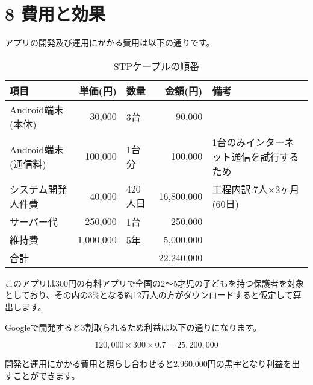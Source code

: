 \documentclass[a4j,titlepage]{jarticle}
\begin{document}
\section{8 費用と効果}
アプリの開発及び運用にかかる費用は以下の通りです。
　\begin{table}[htp]
\begin{center}
  \caption{STPケーブルの順番}
  \begin{tabular}{|l|r|l|r|l|}\hline
    項目& 単価(円) & 数量 & 金額(円) & 備考  \\ \hline 
    Android端末(本体)& 30,000 & 3台 & 90,000 & 　 \\ \hline
    Android端末(通信料)& 100,000 & 1台分 & 100,000 & 1台のみインターネット通信を試行するため  \\ \hline
    システム開発人件費& 40,000 & 420人日 & 16,800,000 & 工程内訳:7人×2ヶ月(60日)  \\ \hline
    サーバー代& 250,000 & 1台 & 250,000 & 　 \\ \hline
    維持費& 1,000,000 & 5年 & 5,000,000 & 　　  \\ \hline
    \multicolumn{3}{|l|}{合計} & 22,240,000 &　 \\ \hline
  \end{tabular}
\end{center}
\end{table}


このアプリは300円の有料アプリで全国の2～5才児の子どもを持つ保護者を対象としており、その内の3\%となる約12万人の方がダウンロードすると仮定して算出します。

Googleで開発すると3割取られるため利益は以下の通りになります。

\begin{equation}
  120,000×300×0.7 = 25,200,000
\end{equation}

開発と運用にかかる費用と照らし合わせると2,960,000円の黒字となり利益を出すことができます。
\end{document}
